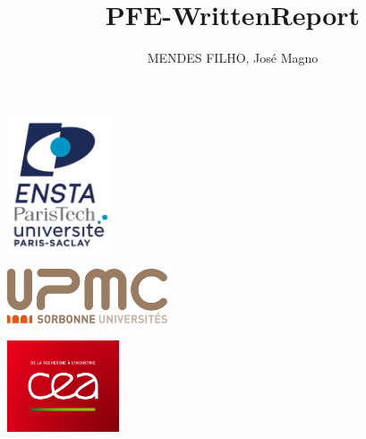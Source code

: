 \title{PFE-WrittenReport}
\author{MENDES FILHO, José Magno}

\newcommand{\N}{\mathbb{N}}
\newcommand{\R}{\mathbb{R}}
\newcommand{\Z}{\mathbb{Z}}


\newenvironment{abstractpage}
  {\cleardoublepage\vspace*{\fill}\thispagestyle{empty}}
  {\vfill\cleardoublepage}
\newenvironment{Abstract}[1]
  {\bigskip\selectlanguage{#1}%
   \begin{center}\bfseries\abstractname\end{center}}
  {\par\bigskip}




\begin{titlepage}

\newcommand{\HRule}{\rule{\linewidth}{0.5mm}}
\center

\begin{minipage}{0.32\textwidth}
\begin{flushleft}
	\includegraphics[height=4.0cm]{./images/logo_ensta.jpg}
\end{flushleft}
\end{minipage}
\begin{minipage}{0.32\textwidth}
\begin{center}
	\includegraphics[height=1.6cm]{./images/upmc.png}
\end{center}
\end{minipage}
\begin{minipage}{0.32\textwidth}
\begin{flushright}
	\includegraphics[height=2.7cm]{./images/cea.png}
\end{flushright}
\end{minipage}
\mbox{}\\[1.5cm]


\end{titlepage}

